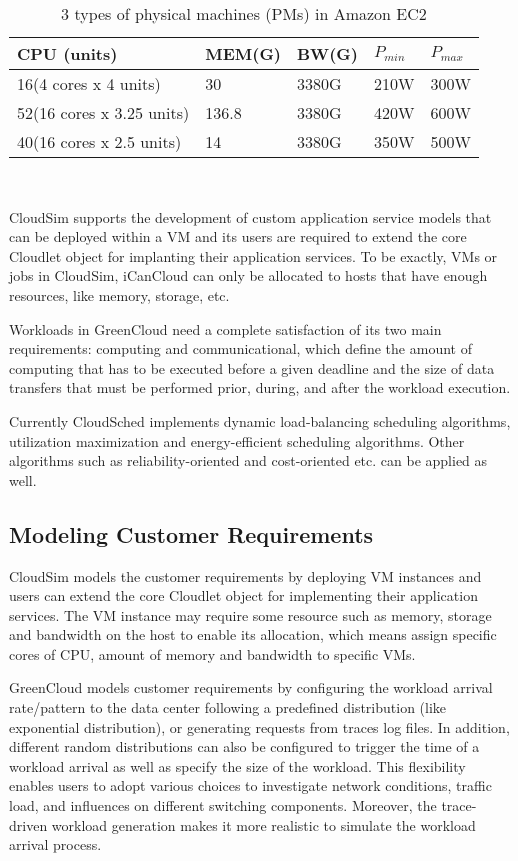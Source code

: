\documentclass[3p, twocolumn]{elsarticle}
\begin{document}
\begin{table}
\scriptsize
\caption{3 types of physical machines (PMs) in Amazon EC2
}
\begin{center}
\begin{tabular}{|l|l|l|l|l|}
\hline CPU (units) & MEM(G)& BW(G)&$P_{min}$&$P_{max}$
\\\hline
\hline 16(4 cores x 4 units) & 30& 3380G &210W&300W \\
\hline 52(16 cores x 3.25 units) & 136.8&3380G&420W&600W \\
\hline 40(16 cores x 2.5 units) &14&3380G&350W&500W \\
\hline
\end{tabular} \\
\end{center}
\end{table}
CloudSim supports the development of custom application service models that can be deployed within a VM and its users are required to extend the core Cloudlet object for implanting their application services. To be exactly, VMs or jobs in CloudSim, iCanCloud can only be allocated to hosts that have enough resources, like memory, storage, etc.

Workloads in GreenCloud need a complete satisfaction of its two main requirements: computing and communicational, which define the amount of computing that has to be executed before a given deadline and the size of data transfers that must be performed prior, during, and after the workload execution.

Currently CloudSched implements dynamic load-balancing scheduling algorithms, utilization maximization and energy-efficient scheduling algorithms. Other algorithms such as reliability-oriented and cost-oriented etc. can be applied as well.

\subsection{Modeling Customer Requirements}
CloudSim models the customer requirements by deploying VM instances and users can extend the core Cloudlet object for implementing their application services. The VM instance may require some resource such as memory, storage and bandwidth on the host to enable its allocation, which means assign specific cores of CPU, amount of memory and bandwidth to specific VMs.

GreenCloud models customer requirements by configuring the workload arrival rate/pattern to the data center following a predefined distribution (like exponential distribution), or generating requests from traces log files. In addition, different random distributions can also be configured to trigger the time of a workload arrival as well as specify the size of the workload. This flexibility enables users to adopt various choices to investigate network conditions, traffic load, and influences on different switching components. Moreover, the trace-driven workload generation makes it more realistic to simulate the workload arrival process.
\end{document}
